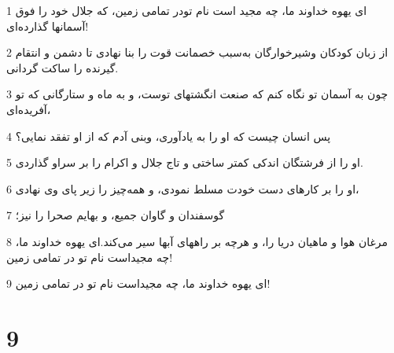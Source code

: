 \par 1 ای یهوه خداوند ما، چه مجید است نام تودر تمامی زمین، که جلال خود را فوق آسمانها گذارده‌ای!
\par 2 از زبان کودکان وشیرخوارگان به‌سبب خصمانت قوت را بنا نهادی تا دشمن و انتقام گیرنده را ساکت گردانی.
\par 3 چون به آسمان تو نگاه کنم که صنعت انگشتهای توست، و به ماه و ستارگانی که تو آفریده‌ای،
\par 4 پس انسان چیست که او را به یادآوری، وبنی آدم که از او تفقد نمایی؟
\par 5 او را از فرشتگان اندکی کمتر ساختی و تاج جلال و اکرام را بر سراو گذاردی.
\par 6 او را بر کارهای دست خودت مسلط نمودی، و همه‌چیز را زیر پای وی نهادی،
\par 7 گوسفندان و گاوان جمیع، و بهایم صحرا را نیز؛
\par 8 مرغان هوا و ماهیان دریا را، و هر‌چه بر راههای آبها سیر می‌کند.‌ای یهوه خداوند ما، چه مجیداست نام تو در تمامی زمین!
\par 9 ‌ای یهوه خداوند ما، چه مجیداست نام تو در تمامی زمین!
 
\chapter{9}

